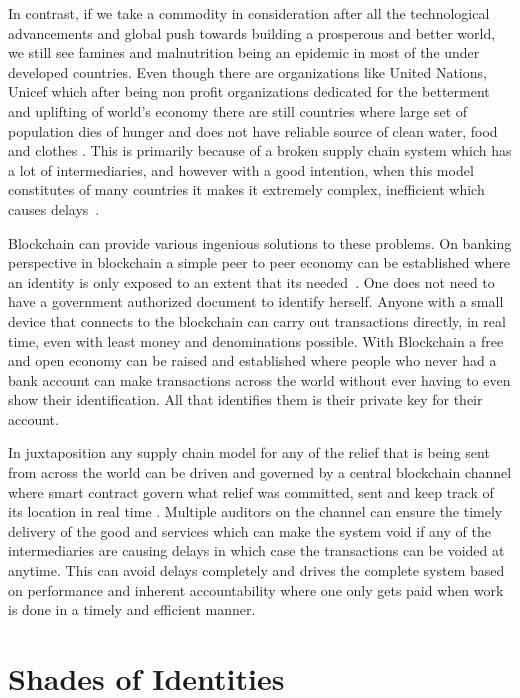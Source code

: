 In contrast, if we take a commodity in consideration after all the
technological advancements and global push towards building a
prosperous and better world, we still see famines and malnutrition
being an epidemic in most of the under developed countries. Even
though there are organizations like United Nations,
Unicef which after being non profit organizations
dedicated for the betterment and uplifting of world's economy there
are still countries where large set of population dies of hunger and
does not have reliable source of clean water, food and clothes
\cite{bbc16}. This is primarily because of a broken supply chain
system which has a lot of intermediaries, and however with a good
intention, when this model constitutes of many countries it makes it
extremely complex, inefficient which causes delays~\cite{van16}.


Blockchain can provide various ingenious solutions to these problems.
On banking perspective in blockchain a simple peer to peer economy can
be established where an identity is only exposed to an extent that its
needed~\cite{yli18}. One does not need to have a government authorized
document to identify herself. Anyone with a small device that connects
to the blockchain can carry out transactions directly, in real time,
even with least money and denominations possible. With Blockchain a
free and open economy can be raised and established where people who
never had a bank account can make transactions across the world
without ever having to even show their identification. All that
identifies them is their private key for their account.

In juxtaposition any supply chain model for any of the relief that is
being sent from across the world can be driven and governed by a
central blockchain channel where smart contract govern what relief was
committed, sent and keep track of its location in real time
\cite{christ19}. Multiple auditors on the channel can ensure the
timely delivery of the good and services which can make the system
void if any of the intermediaries are causing delays in which case the
transactions can be voided at anytime. This can avoid delays
completely and drives the complete system based on performance and
inherent accountability where one only gets paid when work is done in
a timely and efficient manner.

\section{Shades of Identities}

